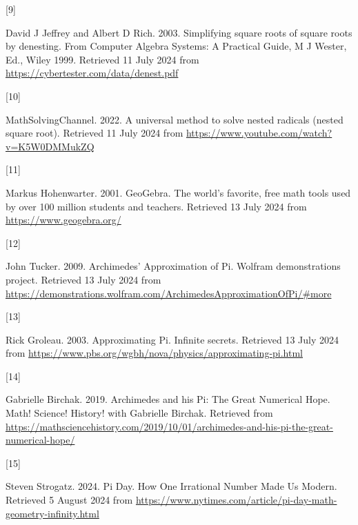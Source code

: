 \documentclass[
  a4paper,
]{article}
\newlength{\cslhangindent}
\newlength{\csllabelwidth}
\newenvironment{CSLReferences}[2] %
 {\begin{list}{}{%
  \setlength{\itemindent}{0pt}
  \setlength{\leftmargin}{0pt}
  \setlength{\parsep}{0pt}
  \ifodd #1
   \setlength{\leftmargin}{\cslhangindent}
   \setlength{\itemindent}{-1\cslhangindent}
  \fi
  \setlength{\itemsep}{#2\baselineskip}}}
 {\end{list}}
\newcommand{\CSLLeftMargin}[1]{\parbox[t]{\csllabelwidth}{\strut#1\strut}}
\newcommand{\CSLRightInline}[1]{\parbox[t]{\linewidth - \csllabelwidth}{\strut#1\strut}}
\begin{document}
\begin{CSLReferences}{0}{0}
\CSLLeftMargin{{[}9{]} }%
\CSLRightInline{David J Jeffrey and Albert D Rich. 2003. Simplifying
square roots of square roots by denesting. {From Computer Algebra
Systems: A Practical Guide, M J Wester, Ed., Wiley 1999}. Retrieved 11
July 2024 from \url{https://cybertester.com/data/denest.pdf}}

\CSLLeftMargin{{[}10{]} }%
\CSLRightInline{MathSolvingChannel. 2022. A universal method to solve
nested radicals (nested square root). Retrieved 11 July 2024 from
\url{https://www.youtube.com/watch?v=K5W0DMMukZQ}}

\CSLLeftMargin{{[}11{]} }%
\CSLRightInline{Markus Hohenwarter. 2001. {GeoGebra}. {The world's
favorite, free math tools used by over 100 million students and
teachers}. Retrieved 13 July 2024 from \url{https://www.geogebra.org/}}

\CSLLeftMargin{{[}12{]} }%
\CSLRightInline{John Tucker. 2009. {Archimedes' Approximation of Pi}.
Wolfram demonstrations project. Retrieved 13 July 2024 from
\url{https://demonstrations.wolfram.com/ArchimedesApproximationOfPi/\#more}}

\CSLLeftMargin{{[}13{]} }%
\CSLRightInline{Rick Groleau. 2003. {Approximating Pi}. Infinite
secrets. Retrieved 13 July 2024 from
\url{https://www.pbs.org/wgbh/nova/physics/approximating-pi.html}}

\CSLLeftMargin{{[}14{]} }%
\CSLRightInline{Gabrielle Bir­chak. 2019. {Archimedes and his Pi: The
Great Numerical Hope}. {Math! Science! History! with Gabrielle Birchak}.
Retrieved from
\url{https://mathsciencehistory.com/2019/10/01/archimedes-and-his-pi-the-great-numerical-hope/}}

\CSLLeftMargin{{[}15{]} }%
\CSLRightInline{Steven Strogatz. 2024. {Pi Day}. {How One Irrational
Number Made Us Modern}. Retrieved 5 August 2024 from
\url{https://www.nytimes.com/article/pi-day-math-geometry-infinity.html}}

\end{CSLReferences}
\end{document}
